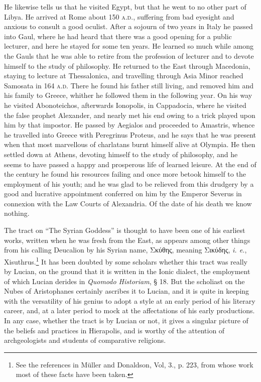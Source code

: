 \documentclass[a4paper, 11pt, oneside, polutonikogreek, english]{article}
\begin{document}
He likewise tells us that he visited Egypt, but that he went to no other part of Libya. He arrived at Rome about 150 \textsc{a.d.}, suffering from bad eyesight and anxious to consult a good oculist. After a sojourn of two years in Italy he passed into Gaul, where he had heard that there was a good opening for a public lecturer, and here he stayed for some ten years. He learned so much while among the Gauls that he was able to retire from the profession of lecturer and to devote himself to the study of philosophy. He returned to the East through Macedonia, staying to lecture at Thessalonica, and travelling through Asia Minor reached Samosata in 164 \textsc{a.d.} There he found his father still living, and removed him and his family to Greece, whither he followed them in the following year. On his way he visited Abonoteichos, afterwards Ionopolis, in Cappadocia, where he visited the false prophet Alexander, and nearly met his end owing to a trick played upon him by that impostor. He passed by Aegialos and proceeded to Amastris, whence he travelled into Greece with Peregrinus Proteus, and he says that he was present when that most marvellous of charlatans burnt himself alive at Olympia. He then settled down at Athens, devoting himself to the study of philosophy, and he seems to have passed a happy and prosperous life of learned leisure. At the end of the century he found his resources failing and once more betook himself to the employment of his youth; and he was glad to be relieved from this drudgery by a good and lucrative appointment conferred on him by the Emperor Severus in connexion with the Law Courts of Alexandria. Of the date of his death we know nothing.

The tract on ``The Syrian Goddess'' is thought to have been one of his earliest works, written when he was fresh from the East, as appears among other things from his calling Deucalion by his Syrian name, Σκύθης, meaning Σικύδης, \emph{i. e.}, Xisuthrus.\footnote{See the references in Müller and Donaldson, Vol, 3., p. 223, from whose work most of these facts have been taken.} It has been doubted by some scholars whether this tract was really by Lucian, on the ground that it is written in the Ionic dialect, the employment of which Lucian derides in \emph{Quomodo Historiam}, § 18. But the scholiast on the Nubes of Aristophanes certainly ascribes it to Lucian, and it is quite in keeping with the versatility of his genius to adopt a style at an early period of his literary career, and, at a later period to mock at the affectations of his early productions. In any case, whether the tract is by Lucian or not, it gives a singular picture of the beliefs and practices in Hierapolis, and is worthy of the attention of archgeologists and students of comparative religions.
\end{document}
